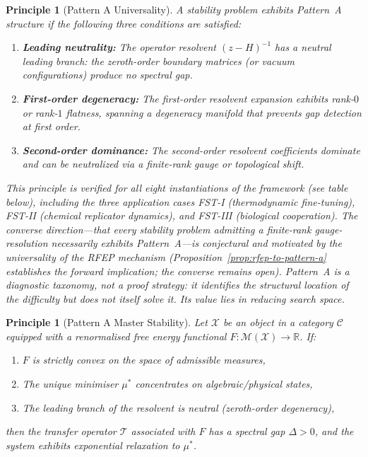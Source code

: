 \documentclass[12pt,a4paper]{article}
\newtheorem{principle}[theorem]{Principle}
\theoremstyle{definition}
\theoremstyle{remark}
\begin{document}
\begin{principle}[Pattern A Universality]
\label{thm:pattern-a-universality}
A stability problem exhibits Pattern~A structure if the following three conditions are satisfied:
\begin{enumerate}[label=(\roman*)]
    \item \textbf{Leading neutrality:} The operator resolvent $(z - H)^{-1}$ has a neutral leading branch: the zeroth-order boundary matrices (or vacuum configurations) produce no spectral gap.
    \item \textbf{First-order degeneracy:} The first-order resolvent expansion exhibits rank-$0$ or rank-$1$ flatness, spanning a degeneracy manifold that prevents gap detection at first order.
    \item \textbf{Second-order dominance:} The second-order resolvent coefficients dominate and can be neutralized via a finite-rank gauge or topological shift.
\end{enumerate}
This principle is verified for all eight instantiations of the framework (see table below), including the three application cases FST-I (thermodynamic fine-tuning), FST-II (chemical replicator dynamics), and FST-III (biological cooperation). The converse direction---that every stability problem admitting a finite-rank gauge-resolution necessarily exhibits Pattern~A---is conjectural and motivated by the universality of the RFEP mechanism (Proposition~\ref{prop:rfep-to-pattern-a} establishes the forward implication; the converse remains open).
Pattern~A is a \emph{diagnostic taxonomy}, not a proof strategy: it identifies the structural location of the difficulty but does not itself solve it. Its value lies in reducing search space.
\end{principle}

\begin{principle}[Pattern A Master Stability]
\label{princ:master-stability}
Let $\mathcal{X}$ be an object in a category $\mathcal{C}$ equipped with a renormalised free energy functional $F: \mathcal{M}(\mathcal{X}) \to \mathbb{R}$. If:
\begin{enumerate}
\item $F$ is strictly convex on the space of admissible measures,
\item The unique minimiser $\mu^*$ concentrates on algebraic/physical states,
\item The leading branch of the resolvent is neutral (zeroth-order degeneracy),
\end{enumerate}
then the transfer operator $\mathcal{T}$ associated with $F$ has a spectral gap $\Delta > 0$, and the system exhibits exponential relaxation to $\mu^*$.
\end{principle}
\end{document}
